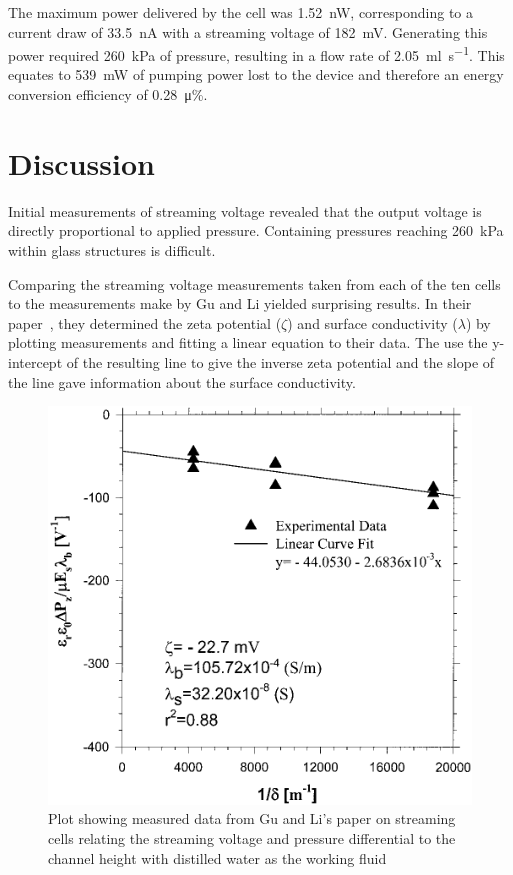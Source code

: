     The maximum power delivered by the cell was \SI{1.52}{\nano\watt}, corresponding to a current draw of \SI{33.5}{\nano\ampere} with a streaming voltage of \SI{182}{\milli\volt}.
    Generating this power required \SI{260}{\kilo\pascal} of pressure, resulting in a flow rate of \SI{2.05}{\milli\litre\per\second}.
    This equates to \SI{539}{\milli\watt} of pumping power lost to the device and therefore an energy conversion efficiency of \SI{0.28}{\micro\percent}.


\section{Discussion}
  \label{sect:part1_energyHarvesting_discussion}


  Initial measurements of streaming voltage revealed that the output voltage is directly proportional to applied pressure.
  Containing pressures reaching \SI{260}{\kilo\pascal} within glass structures is difficult.

  Comparing the streaming voltage measurements taken from each of the ten cells to the measurements make by Gu and Li yielded surprising results.
  In their paper~\cite{Gu2000}, they determined the zeta potential ($\zeta$) and surface conductivity ($\lambda$) by plotting measurements and fitting a linear equation to their data.
  The use the y-intercept of the resulting line to give the inverse zeta potential and the slope of the line gave information about the surface conductivity.

  \begin{figure}
      \centering
      \includegraphics{content/pt1/01-PowerHarvesting/graphics/GuLi_DIUF}
      \caption{\label{fig:Gu_Li_comparison_DUIF}Plot showing measured data from Gu and Li's paper on streaming cells relating the streaming voltage and pressure differential to the channel height with distilled water as the working fluid}
  \end{figure}

